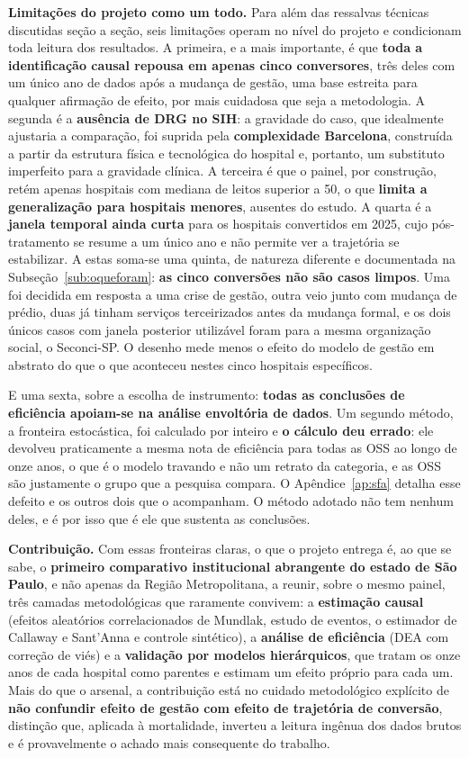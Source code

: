 \textbf{Limitações do projeto como um todo.} Para além das ressalvas
técnicas discutidas seção a seção, seis limitações operam no nível do
projeto e condicionam toda leitura dos resultados. A primeira, e a mais
importante, é que \textbf{toda a identificação causal repousa em apenas
cinco conversores}, três deles com um único ano de dados após a mudança
de gestão, uma base estreita para qualquer afirmação de efeito, por
mais cuidadosa que seja a metodologia. A segunda é a \textbf{ausência de
DRG no SIH}: a gravidade do caso, que idealmente ajustaria a comparação,
foi suprida pela \textbf{complexidade Barcelona}, construída a partir da
estrutura física e tecnológica do hospital e, portanto, um substituto
imperfeito para a gravidade clínica. A terceira é
que o painel, por construção, retém apenas hospitais com mediana de
leitos superior a 50, o que \textbf{limita a generalização para
hospitais menores}, ausentes do estudo. A quarta é a \textbf{janela
temporal ainda curta} para os hospitais convertidos em 2025, cujo
pós-tratamento se resume a um único ano e não permite ver a trajetória
se estabilizar. A estas soma-se uma quinta, de natureza diferente e
documentada na Subseção~\ref{sub:oqueforam}: \textbf{as cinco conversões
não são casos limpos}. Uma foi decidida em resposta a uma crise de
gestão, outra veio junto com mudança de prédio, duas já tinham serviços
terceirizados antes da mudança formal, e os dois únicos casos com janela
posterior utilizável foram para a mesma organização social, o Seconci-SP.
O desenho
mede menos o efeito do modelo de gestão em abstrato do que o que
aconteceu nestes cinco hospitais específicos.

E uma sexta, sobre a escolha de instrumento: \textbf{todas as conclusões
de eficiência apoiam-se na análise envoltória de dados}. Um segundo
método, a fronteira estocástica, foi calculado por inteiro e \textbf{o
cálculo deu errado}: ele devolveu praticamente a mesma nota de eficiência
para todas as OSS ao longo de onze anos, o que é o modelo travando e não
um retrato da categoria, e as OSS são justamente o grupo que a pesquisa
compara. O Apêndice~\ref{ap:sfa} detalha esse defeito e os outros dois
que o acompanham. O método adotado não tem nenhum deles, e é por isso que
é ele que sustenta as conclusões.

\textbf{Contribuição.} Com essas fronteiras claras, o que o projeto
entrega é, ao que se sabe, o \textbf{primeiro comparativo institucional
abrangente do estado de São Paulo}, e não apenas da Região
Metropolitana, a reunir, sobre o mesmo painel, três camadas
metodológicas que raramente convivem: a \textbf{estimação causal}
(efeitos aleatórios correlacionados de Mundlak, estudo de eventos,
o estimador de Callaway e Sant'Anna e controle sintético), a
\textbf{análise de eficiência} (DEA com correção de viés) e a
\textbf{validação por modelos hierárquicos}, que tratam
os onze anos de cada hospital como parentes e estimam um efeito próprio
para cada um. Mais do que o arsenal, a contribuição está no cuidado
metodológico explícito de \textbf{não confundir efeito de gestão com
efeito de trajetória de conversão}, distinção que, aplicada à
mortalidade, inverteu a leitura ingênua dos dados brutos e é
provavelmente o achado mais consequente do trabalho.


